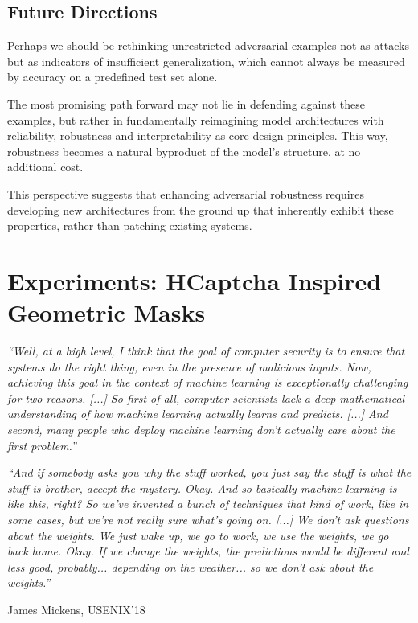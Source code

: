 \documentclass[a4paper, oneside]{discothesis}
\begin{document}
\section{Future Directions}

Perhaps we should be rethinking unrestricted adversarial examples not as attacks but as indicators of insufficient generalization, which cannot always be measured by accuracy on a predefined test set alone.

The most promising path forward may not lie in defending against these examples, but rather in fundamentally reimagining model architectures with reliability, robustness and interpretability as core design principles. This way, robustness becomes a natural byproduct of the model's structure, at no additional cost.

This perspective suggests that enhancing adversarial robustness requires developing new architectures from the ground up that inherently exhibit these properties, rather than patching existing systems.

% 
% 

\chapter{Experiments: HCaptcha Inspired Geometric Masks}
\begin{quotebox}
	\begin{flushright}
		\textit{``Well, at a high level, I think that the goal of computer security is to ensure that systems do the right thing, even in the presence of malicious inputs. Now, achieving this goal in the context of machine learning is exceptionally challenging for two reasons. [...] So first of all, computer scientists lack a deep mathematical understanding of how machine learning actually learns and predicts. [...] And second, many people who deploy machine learning don't actually care about the first problem.''}
		\vspace{1em}

		\textit{``And if somebody asks you why the stuff worked, you just say the stuff is what the stuff is brother, accept the mystery. Okay. And so basically machine learning is like this, right? So we've invented a bunch of techniques that kind of work, like in some cases, but we're not really sure what's going on. [...] We don't ask questions about the weights. We just wake up, we go to work, we use the weights, we go back home. Okay. If we change the weights, the predictions would be different and less good, probably... depending on the weather... so we don't ask about the weights.''}
		\vspace{1em}

		\textemdash{} James Mickens, USENIX'18~\cite{218395}
	\end{flushright}
\end{quotebox}
\end{document}
